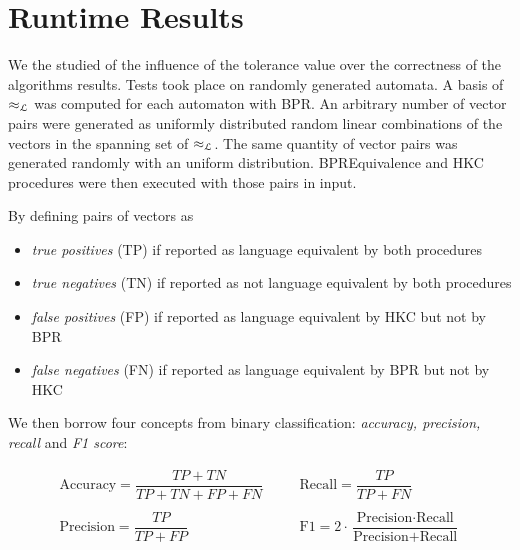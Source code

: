 \section{Runtime Results}


We the studied of the influence 
of the tolerance value over the correctness of the algorithms results.
Tests took place on randomly generated automata. A basis of  $\approx_{\mathcal{L}}$ was 
computed for each automaton with BPR. An arbitrary number of vector pairs were generated 
as uniformly distributed random linear combinations of the vectors in the spanning set of $\approx_{\mathcal{L}}$. 
The same quantity of vector pairs was generated randomly with an uniform distribution.
BPREquivalence and HKC procedures were then executed with those pairs in input.

By defining pairs of vectors as 

\begin{itemize}
    \item \textit{true positives} (TP) if reported as language equivalent by both 
    procedures
    \item \textit{true negatives} (TN) if reported as not language equivalent by both 
    procedures
    \item \textit{false positives} (FP) if reported as language equivalent by HKC but not by BPR
    \item \textit{false negatives} (FN) if reported as  language equivalent by BPR but not by HKC
\end{itemize}


We then borrow four concepts from binary classification: \textit{accuracy, precision, recall} 
and \textit{F1 score}: 

\begin{equation*}
    \begin{aligned}
        \text{Accuracy} = \dfrac{TP + TN}{TP + TN + FP + FN} & \quad & 
        \text{Recall} = \dfrac{TP}{TP + FN} \\ && \\
        \text{Precision} = \dfrac{TP}{TP + FP} & \quad &
        \text{F1} = 2 \cdot \dfrac{\text{Precision} \cdot \text{Recall}}{\text{Precision} + \text{Recall}}  \\ && \\
    \end{aligned}
\end{equation*}

